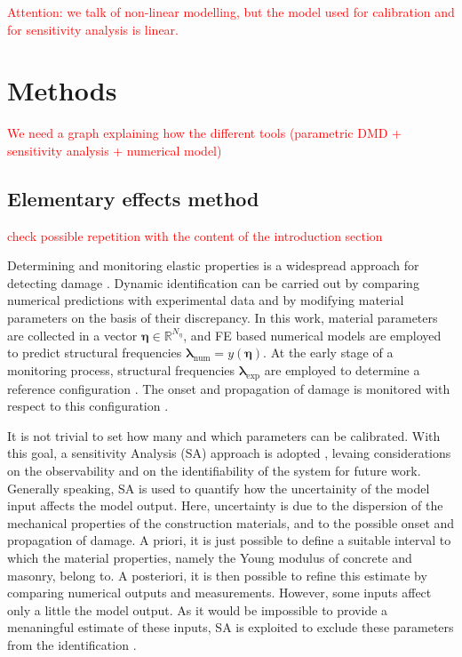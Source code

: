 \documentclass[runningheads]{llncs}
\begin{document}
\textcolor{red}{Attention: we talk of non-linear modelling, but the model used for calibration and for sensitivity analysis is linear.}

\section{Methods}
\label{sec:methods}

\textcolor{red}{We need a graph explaining how the different tools (parametric DMD + sensitivity analysis + numerical model)}

\subsection{Elementary effects method}
\textcolor{red}{check possible repetition with the content of the introduction section}

Determining and monitoring elastic properties is a widespread approach for detecting damage \cite{art:Pandey94}. Dynamic identification can be carried out by comparing numerical predictions with experimental data and by modifying material parameters on the basis of their discrepancy. In this work, material parameters are collected in a vector $\boldsymbol{\eta}\in \mathbb{R}^{N_\eta}$, and FE based numerical models are employed to predict structural frequencies $\boldsymbol{\lambda}_{\text{num}}=y(\boldsymbol{\eta})$. At the early stage of a monitoring process, structural frequencies $\boldsymbol{\lambda}_{\text{exp}}$ are employed to determine a reference configuration \cite{art:Kamariotis21}. The onset and propagation of damage is monitored with respect to this configuration \cite{thesis:PhD}.

It is not trivial to set how many and which parameters can be calibrated. With this goal, a sensitivity Analysis (SA) approach is adopted \cite{chp:Saltelli07_1}, levaing considerations on the observability and on the identifiability of the system \cite{art:Kalman63} for future work. Generally speaking, SA is used to quantify how the uncertainity of the model input affects the model output. Here, uncertainty is due to the dispersion of the mechanical properties of the construction materials, and to the possible onset and propagation of damage. A priori, it is just possible to define a suitable interval to which the material properties, namely the Young modulus of concrete and masonry, belong to. A posteriori, it is then possible to refine this estimate by comparing numerical outputs and measurements. However, some inputs affect only a little the model output. As it would be impossible to provide a menaningful estimate of these inputs, SA is exploited to exclude these parameters from the identification \cite{chp:Saltelli07_1}.
\end{document}
